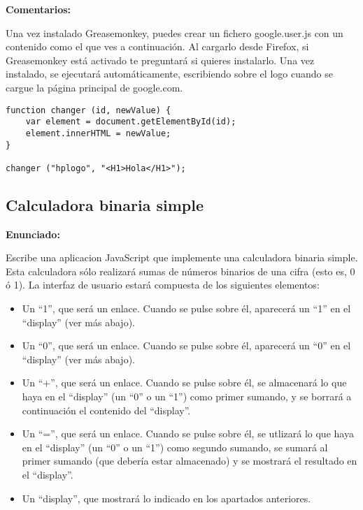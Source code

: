 \textbf{Comentarios:}

Una vez instalado Greasemonkey, puedes crear un fichero google.user.js con un contenido como el que ves a continuación. Al cargarlo desde Firefox, si Greasemonkey está activado te preguntará si quieres instalarlo. Una vez instalado, se ejecutará automáticamente, escribiendo sobre el logo cuando se cargue la página principal de google.com.

\begin{verbatim}
function changer (id, newValue) {
    var element = document.getElementById(id);
    element.innerHTML = newValue;
}

changer ("hplogo", "<H1>Hola</H1>");
\end{verbatim}

\subsection{Calculadora binaria simple}
\label{subsec:eje-js-calc-binaria-1}


\textbf{Enunciado:}

Escribe una aplicacion JavaScript que implemente una calculadora binaria simple. Esta calculadora sólo realizará sumas de números binarios de una cifra (esto es, 0 ó 1). La interfaz de usuario estará compuesta de los siguientes elementos:

\begin{itemize}
\item Un ``1'', que será un enlace. Cuando se pulse sobre él, aparecerá un ``1'' en el ``display'' (ver más abajo).
\item Un ``0'', que será un enlace. Cuando se pulse sobre él, aparecerá un ``0'' en el ``display'' (ver más abajo).
\item Un ``+'', que será un enlace. Cuando se pulse sobre él, se almacenará lo que haya en el ``display'' (un ``0'' o un ``1'') como primer sumando, y se borrará a continuación el contenido del ``display''.
\item Un ``='', que será un enlace. Cuando se pulse sobre él, se utlizará lo que haya en el ``display'' (un ``0'' o un ``1'') como segundo sumando, se sumará al primer sumando (que debería estar almacenado) y se mostrará el resultado en el ``display''.
\item Un ``display'', que mostrará lo indicado en los apartados anteriores.
\end{itemize}

